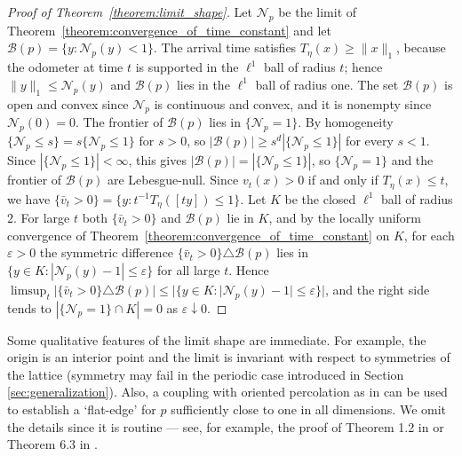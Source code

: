 \documentclass[12pt]{amsart}
\begin{document}
\begin{proof}[Proof of Theorem~\ref{theorem:limit_shape}] Let $\mathcal{N}_p$ be the limit of Theorem~\ref{theorem:convergence_of_time_constant} and let $\mathcal{B}(p)=\{y:\mathcal{N}_p(y)<1\}$. The arrival time satisfies $T_{\eta}(x)\geq\|x\|_1$, because the odometer at time $t$ is supported in the $\ell^1$ ball of radius $t$; hence $\|y\|_1\leq\mathcal{N}_p(y)$ and $\mathcal{B}(p)$ lies in the $\ell^1$ ball of radius one. The set $\mathcal{B}(p)$ is open and convex since $\mathcal{N}_p$ is continuous and convex, and it is nonempty since $\mathcal{N}_p(0)=0$.
The frontier of $\mathcal{B}(p)$ lies in $\{\mathcal{N}_p=1\}$. By homogeneity $\{\mathcal{N}_p\leq s\}=s\{\mathcal{N}_p\leq1\}$ for $s>0$, so $|\mathcal{B}(p)|\geq s^d|\{\mathcal{N}_p\leq1\}|$ for every $s<1$. Since $|\{\mathcal{N}_p\leq1\}|<\infty$, this gives $|\mathcal{B}(p)|=|\{\mathcal{N}_p\leq1\}|$, so $\{\mathcal{N}_p=1\}$ and the frontier of $\mathcal{B}(p)$ are Lebesgue-null. Since $v_t(x)>0$ if and only if $T_{\eta}(x)\leq t$, we have $\{\bar{v}_t>0\}=\{y:t^{-1}T_{\eta}([ty])\leq1\}$. Let $K$ be the closed $\ell^1$ ball of radius $2$. For large $t$ both $\{\bar{v}_t>0\}$ and $\mathcal{B}(p)$ lie in $K$, and by the locally uniform convergence of Theorem~\ref{theorem:convergence_of_time_constant} on $K$, for each $\varepsilon>0$ the symmetric difference $\{\bar{v}_t>0\}\triangle\mathcal{B}(p)$ lies in $\{y\in K:|\mathcal{N}_p(y)-1|\leq\varepsilon\}$ for all large $t$. Hence $\limsup_{t}|\{\bar{v}_t>0\}\triangle\mathcal{B}(p)|\leq|\{y\in K:|\mathcal{N}_p(y)-1|\leq\varepsilon\}|$, and the right side tends to $|\{\mathcal{N}_p=1\}\cap K|=0$ as $\varepsilon\downarrow0$. \end{proof}
\begin{remark}
	Some qualitative features of the limit shape are immediate. For example, the origin is an interior point and the limit 
	is invariant with respect to symmetries of the lattice (symmetry may fail in the periodic case introduced in Section \ref{sec:generalization}).	
	Also, a coupling with oriented percolation as in \cite{durrett1981shape, marchand2002strict} can be used to establish a `flat-edge' 
	for $p$ sufficiently close to one in all dimensions. We omit the details since it is routine --- see, for example, the proof of Theorem 1.2 in \cite{alves2002shape} or Theorem 6.3 in \cite{garet2004asymptotic}.
\end{remark}
\end{document}
